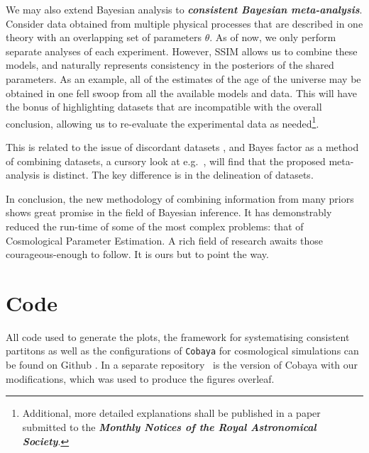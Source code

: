 \documentclass[usenatbib]{mnras}
\begin{document}
We may also extend Bayesian analysis to \textbf{\emph{consistent
    Bayesian meta-analysis}}. Consider data obtained from multiple
physical processes that are described in one theory with an
overlapping set of parameters $\theta$. As of now, we only perform
separate analyses of each experiment. However, SSIM allows us to
combine these models, and naturally represents consistency in the
posteriors of the shared parameters. As an example, all of the
estimates of the age of the universe may be obtained in one fell swoop
from all the available models and data. This will have the bonus of
highlighting datasets that are incompatible with the overall
conclusion, allowing us to re-evaluate the experimental data as
needed\footnote{Additional, more detailed explanations shall be
  published in a paper submitted to the \textbf{\emph{Monthly Notices
      of the Royal Astronomical Society}}.}.

This is related to the issue of discordant datasets \citep{tension},
and Bayes factor as a method of combining datasets, a cursory look at
e.g.~\cite{Marshall_2006}, will find that the proposed meta-analysis
is distinct. The key difference is in the delineation of datasets.


In conclusion, the new methodology of combining information from many
priors shows great promise in the field of Bayesian inference. It has
demonstrably reduced the run-time of some of the most complex
problems: that of Cosmological Parameter Estimation. A rich field of
research awaits those courageous-enough to follow. It is ours but to point
the way.

\appendix
\section{Code}
All code used to generate the plots, the framework for systematising
consistent partitons as well as the configurations of \texttt{Cobaya}
for cosmological simulations can be found on Github \citep{sspr}. In a
separate repository~\citep{code} is the version of Cobaya with our
modifications, which was used to produce the figures overleaf.



\end{document}
